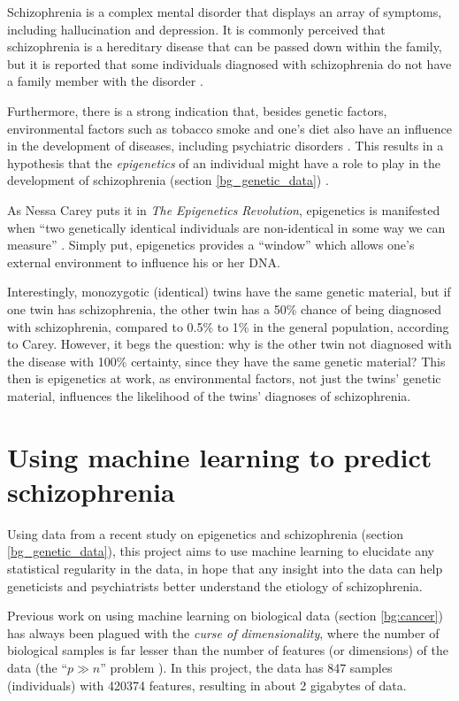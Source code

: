 \documentclass[12pt, twoside, a4paper]{report}
\begin{document}
Schizophrenia is a complex mental disorder that displays an array of symptoms, including hallucination and depression. It is commonly perceived that schizophrenia is a hereditary disease that can be passed down within the family, but it is reported that some individuals diagnosed with schizophrenia do not have a family member with the disorder \cite{RefWorks:8}. 

Furthermore, there is a strong indication that, besides genetic factors, environmental factors such as tobacco smoke and one's diet also have an influence in the development of diseases, including psychiatric disorders \cite{RefWorks:8, RefWorks:10, RefWorks:247}. This results in a hypothesis that the \textit{epigenetics} of an individual might have a role to play in the development of schizophrenia (section \ref{bg_genetic_data}) \cite{RefWorks:12}.

As Nessa Carey puts it in \textit{The Epigenetics Revolution}, epigenetics is manifested when ``two genetically identical individuals are non-identical in some way we can measure'' \cite{RefWorks:248}. Simply put, epigenetics provides a ``window'' which allows one's external environment to influence his or her DNA.

Interestingly, monozygotic (identical) twins have the same genetic material, but if one twin has schizophrenia, the other twin has a 50\% chance of being diagnosed with schizophrenia, compared to 0.5\% to 1\% in the general population, according to Carey. However, it begs the question: why is the other twin not diagnosed with the disease with 100\% certainty, since they have the same genetic material? This then is epigenetics at work, as environmental factors, not just the twins' genetic material, influences the likelihood of the twins' diagnoses of schizophrenia.


\section{Using machine learning to predict schizophrenia} \label{intro_ML}

Using data from a recent study on epigenetics and schizophrenia (section \ref{bg_genetic_data}), this project aims to use machine learning to elucidate any statistical regularity in the data, in hope that any insight into the data can help geneticists and psychiatrists better understand the etiology of schizophrenia.

Previous work on using machine learning on biological data (section \ref{bg:cancer}) has always been plagued with the \textit{curse of dimensionality}, where the number of biological samples is far lesser than the number of features (or dimensions) of the data (the ``$p \gg n$'' problem \cite{RefWorks:96}). In this project, the data has 847 samples (individuals) with 420374 features, resulting in about 2 gigabytes of data.
\end{document}

